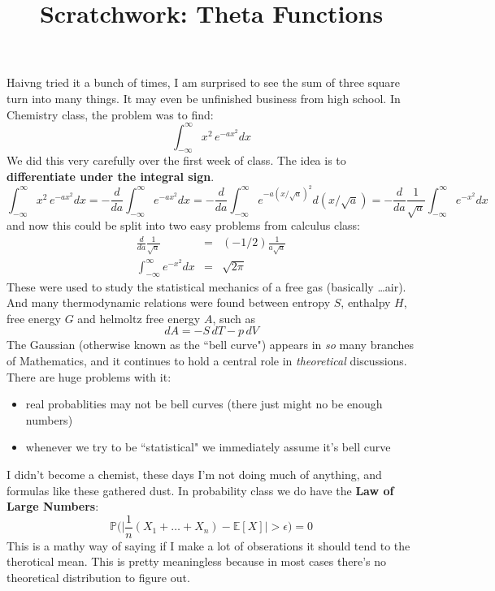 \documentclass[12pt]{article}
\title{Scratchwork: Theta Functions}
\date{}
\begin{document}

\sffamily

\maketitle

\noindent Haivng tried it a bunch of times, I am surprised to see the sum of three square turn into many things.  It may even be unfinished business from high school.  In Chemistry class, the problem was to find:
$$ \int_{-\infty}^\infty x^2\,e^{-ax^2 }dx  $$
We did this very carefully over the first week of class. The idea is to \textbf{differentiate under the integral sign}. 
$$  \int_{-\infty}^\infty x^2\,e^{-ax^2 }dx
=  -\frac{d}{da} \int_{-\infty}^\infty e^{-ax^2 }dx
=  -\frac{d}{da} \int_{-\infty}^\infty e^{-a(x/\sqrt{a})^2 }d(x/\sqrt{a})
=  -\frac{d}{da}  \frac{1}{\sqrt{a}}\int_{-\infty}^\infty e^{-x^2 }dx
$$
and now this could be split into two easy problems from calculus class:
\begin{eqnarray*}  \frac{d}{da} \frac{1}{\sqrt{a}} &=& (-1/2) \frac{1}{a \sqrt{a}} \\
\int_{-\infty}^\infty e^{-x^2 }dx &=& \sqrt{2\pi}
\end{eqnarray*}
These were used to study the statistical mechanics of a free gas (basically \dots air). And many thermodynamic relations were found between entropy $S$, enthalpy $H$, free energy $G$ and helmoltz free energy $A$, such as 
$$ dA = - S \, dT - p \, dV $$ 
The Gaussian (otherwise known as the ``bell curve") appears in \textit{so} many branches of Mathematics, and it continues to hold a central role in \textit{theoretical} discussions.  There are huge problems with it:
\begin{itemize}
\item real probablities may not be bell curves (there just might no be enough numbers)
\item whenever we try to be ``statistical" we immediately assume it's bell curve
\end{itemize}
I didn't become a chemist, these days I'm not doing much of anything, and formulas like these gathered dust.  In probability class we do have the \textbf{Law of Large Numbers}:
$$ \mathbb{P}\big( \big| \frac{1}{n}(X_1 + \dots + X_n) - \mathbb{E}[X] \big| > \epsilon \big) = 0 $$
This is a mathy way of saying if I make a lot of obserations it should tend to the therotical mean.  This is pretty meaningless because in most cases there's no theoretical distribution to figure out.  \\ \\
\end{document}
